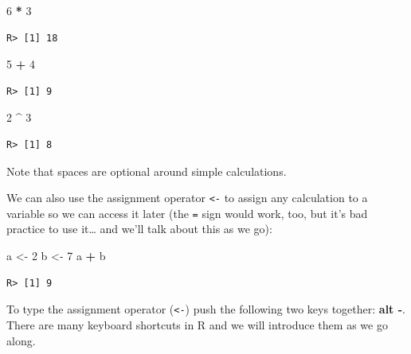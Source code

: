 \documentclass[
]{book}
\newenvironment{Shaded}{\begin{snugshade}}{\end{snugshade}}
\newcommand{\DecValTok}[1]{\textcolor[rgb]{0.00,0.00,0.81}{#1}}
\newcommand{\NormalTok}[1]{#1}
\newcommand{\OperatorTok}[1]{\textcolor[rgb]{0.81,0.36,0.00}{\textbf{#1}}}
\newcommand{\StringTok}[1]{\textcolor[rgb]{0.31,0.60,0.02}{#1}}
\begin{document}
\begin{Shaded}
\begin{Highlighting}[]
\DecValTok{6} \OperatorTok{*}\StringTok{ }\DecValTok{3}
\end{Highlighting}
\end{Shaded}

\begin{verbatim}
R> [1] 18
\end{verbatim}

\begin{Shaded}
\begin{Highlighting}[]
\DecValTok{5} \OperatorTok{+}\StringTok{ }\DecValTok{4}
\end{Highlighting}
\end{Shaded}

\begin{verbatim}
R> [1] 9
\end{verbatim}

\begin{Shaded}
\begin{Highlighting}[]
\DecValTok{2} \OperatorTok{\^{}}\StringTok{ }\DecValTok{3}
\end{Highlighting}
\end{Shaded}

\begin{verbatim}
R> [1] 8
\end{verbatim}

Note that spaces are optional around simple calculations.

We can also use the assignment operator \texttt{\textless{}-} to assign any calculation to a variable so we can access it later (the \texttt{=} sign would work, too, but it's bad practice to use it\ldots{} and we'll talk about this as we go):

\begin{Shaded}
\begin{Highlighting}[]
\NormalTok{a <{-}}\StringTok{ }\DecValTok{2}
\NormalTok{b <{-}}\StringTok{ }\DecValTok{7}
\NormalTok{a }\OperatorTok{+}\StringTok{ }\NormalTok{b}
\end{Highlighting}
\end{Shaded}

\begin{verbatim}
R> [1] 9
\end{verbatim}

To type the assignment operator (\texttt{\textless{}-}) push the following two keys together: \textbf{alt -}. There are many keyboard shortcuts in R and we will introduce them as we go along.
\end{document}
